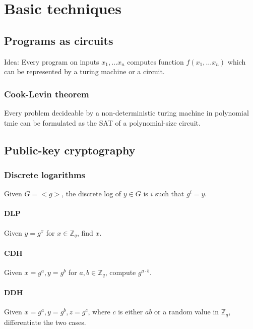 \section{Basic techniques}

\subsection{Programs as circuits}

Idea: Every program on inputs $x_1, \ldots x_n$ computes function $f(x_1,
\ldots x_n)$ which can be represented by a turing machine or a circuit.

\subsubsection{Cook-Levin theorem}

Every problem decideable by a non-deterministic turing machine in polynomial
tmie can be formulated as the SAT of a polynomial-size circuit.

\subsection{Public-key cryptography}

\subsubsection{Discrete logarithms}

Given $G = <g>$, the discrete log of $y \in G$ is $i$ such that $g^i = y$.

\paragraph{DLP}

Given $y = g^x$ for $x \in \mathbb{Z}_q$, find $x$.

\paragraph{CDH}

Given $x = g^a, y = g^b$ for $a, b \in \mathbb{Z}_q$, compute $g^{a \cdot b}$.

\paragraph{DDH}

Given $x = g^a, y = g^b, z = g^c$, where $c$ is either $ab$ or a random value
in $\mathbb{Z}_q$, differentiate the two cases.


